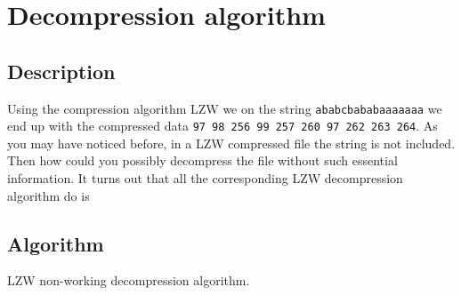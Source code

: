 \begin{refsection}
\begin{algorithm}[H]
\begin{algorithmic}[1]



        \EndIf


      \EndIf


    \EndWhile

    \State {}
    \State {}

  \end{algorithmic}
\end{algorithm}

\section{Decompression algorithm}

\subsection{Description}

Using the compression algorithm LZW we on the string
\texttt{ababcbababaaaaaaa} we end up with the compressed data
\texttt{97 98 256 99 257 260 97 262 263 264}. As you may have noticed
before, in a LZW compressed file the string is not included. Then how
could you possibly decompress the file without such essential
information. It turns out that all the corresponding LZW decompression
algorithm do is

\subsection{Algorithm}


\begin{algorithm}[H]
  \caption{LZW non-working decompression algorithm.}
  \label{alg:lzw-non-working-decompression}
  \begin{algorithmic}[1]
    \State {}
    \While{\neof}


      \State {}


\end{algorithmic}
\end{algorithm}
\end{refsection}
